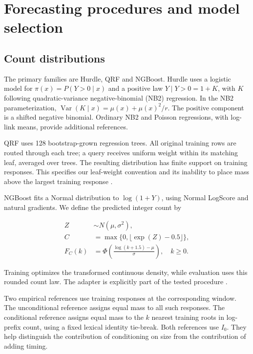 \hypertarget{forecasting-procedures-and-model-selection}{%
\section{Forecasting procedures and model selection}}

\hypertarget{count-distributions}{%
\subsection{Count distributions}}

The primary families are Hurdle, QRF and NGBoost. Hurdle uses a logistic model for \(\pi(x)=P(Y>0\mid x)\) and a positive law \(Y\mid Y>0=1+K\), with \(K\) following quadratic-variance negative-binomial (NB2) regression. In the NB2 parameterization, \(\operatorname{Var}(K\mid x)=\mu(x)+\mu(x)^2/r\). The positive component is a shifted negative binomial. Ordinary NB2 and Poisson regressions, with log-link means, provide additional references.

QRF uses 128 bootstrap-grown regression trees. All original training rows are routed through each tree; a query receives uniform weight within its matching leaf, averaged over trees. The resulting distribution has finite support on training responses. This specifies our leaf-weight convention and its inability to place mass above the largest training response \cite{qrf2006}.

NGBoost fits a Normal distribution to \(\log(1+Y)\), using Normal LogScore and natural gradients. We define the predicted integer count by

\begin{align}
Z&\sim N(\mu,\sigma^2),\\
C&=\max\{0,\lfloor \exp(Z)-0.5\rfloor\},\\
F_C(k)&=\Phi\!\left(\frac{\log(k+1.5)-\mu}{\sigma}\right),\quad k\ge0.
\end{align}

Training optimizes the transformed continuous density, while evaluation uses this rounded count law. The adapter is explicitly part of the tested procedure \cite{ngboost2020}.

Two empirical references use training responses at the corresponding window. The unconditional reference assigns equal mass to all such responses. The conditional reference assigns equal mass to the \(k\) nearest training roots in log-prefix count, using a fixed lexical identity tie-break. Both references use \(I_0\). They help distinguish the contribution of conditioning on size from the contribution of adding timing.

